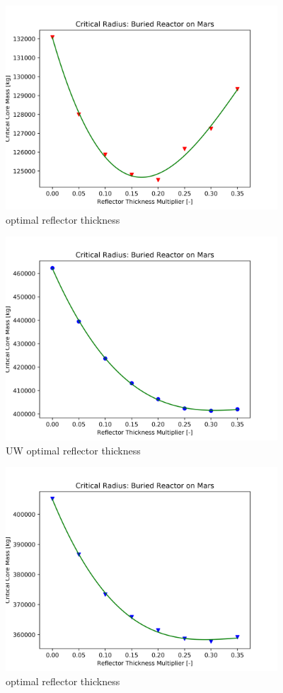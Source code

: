 \begin{figure}[h]
    \centering
    \includegraphics[width=4in]{../images/opt_refl_H2O_UO2.png}
\caption{\water \uox optimal reflector thickness}
\label{fig:uo2_h2o_refl}
\end{figure}

\begin{figure}[h]
    \centering
    \includegraphics[width=4in]{../images/opt_refl_CO2_UN.png}
\caption{\codiox UW optimal reflector thickness}
\label{fig:uw_co2_refl}
\end{figure}

\begin{figure}[h]
    \centering
    \includegraphics[width=4in]{../images/opt_refl_H2O_UN.png}
\caption{\water \uox optimal reflector thickness}
\label{fig:uw_h2o_refl}
\end{figure}

